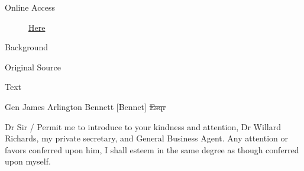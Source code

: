 			\begin{description}
				\item[Online Access] \href{https://www.josephsmithpapers.org/paper-summary/letter-to-james-arlington-bennet-30-june-1842/1}{Here}
			\end{description}
			
			\begin{description}
				\item[Background]
			\end{description}
			
			
			\begin{description}
				\item[Original Source]
			\end{description}
			
			
			\begin{description}
				\item[Text]
			\end{description}
			

				Gen James Arlington Bennett [Bennet] \sout{Esqr}

				Dr Sir / Permit me to introduce to your kindness and attention, Dr Willard Richards, my private secretary, and General Business Agent. Any attention or favors conferred upon him, I shall esteem in the same degree as though conferred upon myself.

